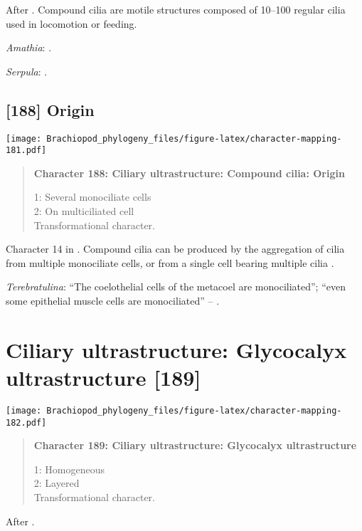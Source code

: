 \documentclass[openany]{book}
\theoremstyle{definition}
\theoremstyle{definition}
\theoremstyle{definition}
\theoremstyle{remark}
\begin{document}
After \citet{Lundin2009}. Compound cilia are motile structures composed
of 10--100 regular cilia used in locomotion or feeding.

\hypertarget{Amathia-coding-187}{}
\emph{Amathia}: \citet{Reed1982}.

\hypertarget{Serpula-coding-187}{}
\emph{Serpula}: \citet{Nielsen1987}.

\subsection*{{[}188{]} Origin}\label{origin-1}

\texttt{[image: Brachiopod\_phylogeny\_files/figure-latex/character-mapping-181.pdf]}

\begin{quote}
\textbf{Character 188: Ciliary ultrastructure: Compound cilia: Origin}

1: Several monociliate cells\\
2: On multiciliated cell\\
Transformational character.
\end{quote}

Character 14 in \citet{Glenner2004}. Compound cilia can be produced by
the aggregation of cilia from multiple monociliate cells, or from a
single cell bearing multiple cilia \citep{Nielsen1987}.

\hypertarget{Terebratulina-coding-188}{}
\emph{Terebratulina}: ``The coelothelial cells of the metacoel are
monociliated''; ``even some epithelial muscle cells are monociliated''
-- \citet{Luter1995}.

\section{Ciliary ultrastructure: Glycocalyx ultrastructure
{[}189{]}}\label{ciliary-ultrastructure-glycocalyx-ultrastructure-189}

\texttt{[image: Brachiopod\_phylogeny\_files/figure-latex/character-mapping-182.pdf]}

\begin{quote}
\textbf{Character 189: Ciliary ultrastructure: Glycocalyx
ultrastructure}

1: Homogeneous\\
2: Layered\\
Transformational character.
\end{quote}

After \citet{Lundin2009}.
\end{document}
